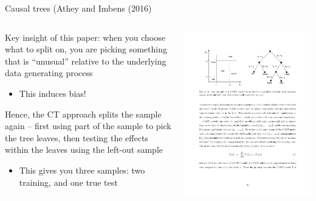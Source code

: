 \documentclass[notes,11pt, aspectratio=169]{beamer}
\newenvironment{wideitemize}{\itemize\addtolength{\itemsep}{10pt}}{\enditemize}
\begin{document}
\begin{frame}{Causal trees (Athey and Imbens (2016)}
    \begin{columns}[onlytextwidth, T] %
      \begin{column}{.5\textwidth}
        \begin{wideitemize}
        \item Key insight of this paper: when you choose what to split
          on, you are picking something that is ``unusual'' relative
          to the underlying data generating process
          \begin{itemize}
          \item This induces bias!
          \end{itemize}
        \item Hence, the CT approach splits the sample again -- first
          using part of the sample to pick the tree leaves, then
          testing the effects within the leaves using the left-out
          sample
          \begin{itemize}
          \item This gives you three samples: two training, and one true test
          \end{itemize}
        \end{wideitemize}
      \end{column}%
      \hfill%
      \begin{column}{.5\textwidth}
        \includegraphics[width=\linewidth]{images/Tree_Lo.pdf}
      \end{column}%
    \end{columns}
\end{frame}
\end{document}
